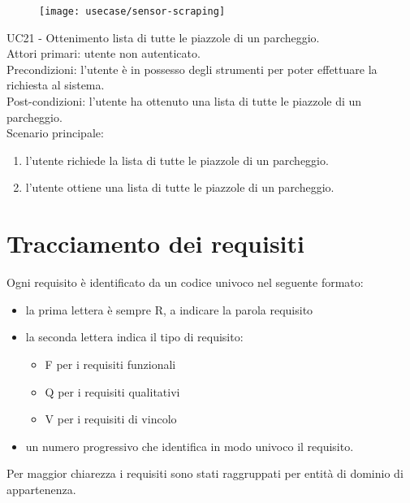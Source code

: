 \leavevmode\newline
\begin{figure}[!h]
    \centering
    \texttt{[image: usecase/sensor-scraping]}
\end{figure}
UC21 - Ottenimento lista di tutte le piazzole di un parcheggio.
\\
Attori primari: utente non autenticato.
\\
Precondizioni: l'utente è in possesso degli strumenti per poter effettuare la richiesta al sistema.
\\
Post-condizioni: l'utente ha ottenuto una lista di tutte le piazzole di un parcheggio.
\\
Scenario principale:
\begin{enumerate}
    \item l'utente richiede la lista di tutte le piazzole di un parcheggio.
    \item l'utente ottiene una lista di tutte le piazzole di un parcheggio.
\end{enumerate}

\section{Tracciamento dei requisiti}
Ogni requisito è identificato da un codice univoco nel seguente formato:
\begin{itemize}
    \item la prima lettera è sempre R, a indicare la parola requisito
    \item la seconda lettera indica il tipo di requisito:
    \begin{itemize}
        \item F per i requisiti funzionali
        \item Q per i requisiti qualitativi
        \item V per i requisiti di vincolo
    \end{itemize}
    \item un numero progressivo che identifica in modo univoco il requisito.
\end{itemize}
Per maggior chiarezza i requisiti sono stati raggruppati per entità di dominio di appartenenza.

